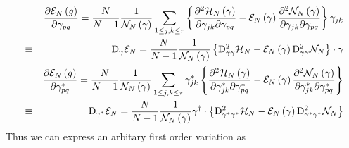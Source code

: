 \documentclass[aps,preprint]{revtex4}
\begin{document}
\begin{eqnarray}
&&\frac{\partial \mathcal{E}_{N}\left( g\right) }{\partial \gamma _{pq}}=%
\frac{N}{N-1}\frac{1}{\mathcal{N}_{N}\left( \mathbf{\gamma }\right) }%
\sum_{1\leq j,k\leq r}\left\{ \frac{\partial ^{2}\mathcal{H}_{N}\left( 
\mathbf{\gamma }\right) }{\partial \gamma _{jk}\partial \gamma _{pq}}-%
\mathcal{E}_{N}\left( \mathbf{\gamma }\right) \frac{\partial ^{2}\mathcal{N}%
_{N}\left( \mathbf{\gamma }\right) }{\partial \gamma _{jk}\partial \gamma
_{pq}}\right\} \gamma _{jk}  \nonumber \\
&\equiv &\mathrm{D}_{\gamma }\mathcal{E}_{N}=\frac{N}{N-1}\frac{1}{\mathcal{N%
}_{N}\left( \mathbf{\gamma }\right) }\left\{ \mathrm{D}_{\gamma \gamma }^{2}%
\mathcal{H}_{N}-\mathcal{E}_{N}\left( \mathbf{\gamma }\right) \mathrm{D}%
_{\gamma \gamma }^{2}\mathcal{N}_{N}\right\} \cdot \mathbf{\gamma } \\
&&\frac{\partial \mathcal{E}_{N}\left( g\right) }{\partial \gamma
_{pq}^{\ast }}=\frac{N}{N-1}\frac{1}{\mathcal{N}_{N}\left( \mathbf{\gamma }%
\right) }\sum_{1\leq j,k\leq r}\gamma _{jk}^{\ast }\left\{ \frac{\partial
^{2}\mathcal{H}_{N}\left( \mathbf{\gamma }\right) }{\partial \gamma
_{jk}^{\ast }\partial \gamma _{pq}^{\ast }}-\mathcal{E}_{N}\left( \mathbf{%
\gamma }\right) \frac{\partial ^{2}\mathcal{N}_{N}\left( \mathbf{\gamma }%
\right) }{\partial \gamma _{jk}^{\ast }\partial \gamma _{pq}^{\ast }}\right\}
\nonumber \\
&\equiv &\mathrm{D}_{\gamma ^{\ast }}\mathcal{E}_{N}=\frac{N}{N-1}\frac{1}{%
\mathcal{N}_{N}\left( \mathbf{\gamma }\right) }\mathbf{\gamma }^{\dagger
}\cdot \left\{ \mathrm{D}_{\gamma ^{\ast }\gamma ^{\ast }}^{2}\mathcal{H}%
_{N}-\mathcal{E}_{N}\left( \mathbf{\gamma }\right) \mathrm{D}_{\gamma ^{\ast
}\gamma ^{\ast }}^{2}\mathcal{N}_{N}\right\}
\end{eqnarray}%
Thus we can express an arbitary first order variation as 
\end{document}
